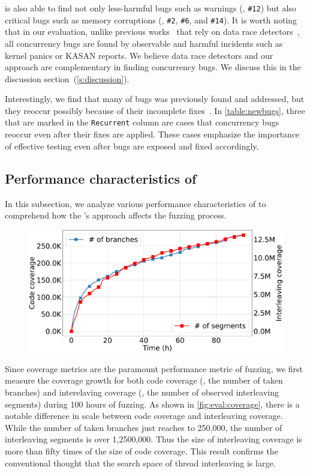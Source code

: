 \sys is also able to find not only less-harmful bugs such as warnings
(\eg, \texttt{\#12}) but also critical bugs such as memory corruptions
(\eg, \texttt{\#2}, \texttt{\#6}, and \texttt{\#14}).
%
It is worth noting that in our evaluation, unlike previous
works~\cite{snowboard, krace} that rely on data race
detectors~\cite{kcsan, tsan}, all concurrency bugs are found by
observable and harmful incidents such as kernel panics or KASAN
reports.
%
\dr{}
We believe data race detectors and our approach are complementary in
finding concurrency bugs. We discuss this in the discussion
section~(\autoref{s:discussion}).

Interestingly, we find that many of bugs was previously found and
addressed, but they reoccur possibly because of their incomplete
fixes~\cite{learningfrommistakes}.
%
In \autoref{table:newbugs}, three that are marked in the
\texttt{Recurrent} column are cases that concurrency bugs reoccur even
after their fixes are applied.
%
These cases emphasize the importance of effective testing even after
bugs are exposed and fixed accordingly.






\subsection{Performance characteristics of \sys}
\label{ss:characteristics}

In this subsection, we analyze various performance characteristics of
\sys to comprehend how the \sys's approach affects the fuzzing
process.

%
\begin{figure}[t]
  \centering
  \includegraphics[width=\linewidth]{fig/coverage_graph-crop.pdf}
  \caption{}
  \label{fig:eval:coverage}
\end{figure}
%
Since coverage metrics are the paramount performance metric of
fuzzing, we first measure the coverage growth for both code coverage
(\ie, the number of taken branches) and interelaving coverage (\ie,
the number of observed interleaving segments) during 100 hours of
fuzzing.
%
As shown in \autoref{fig:eval:coverage}, there is a notable difference
in scale between code coverage and interleaving coverage.
%
While the number of taken branches just reaches to 250,000, the number
of interleaving segments is over 1,2500,000. Thus the size of
interleaving coverage is more than fifty times of the size of code
coverage.
%
This result confirms the conventional thought that the search space of
thread interleaving is large.
%

